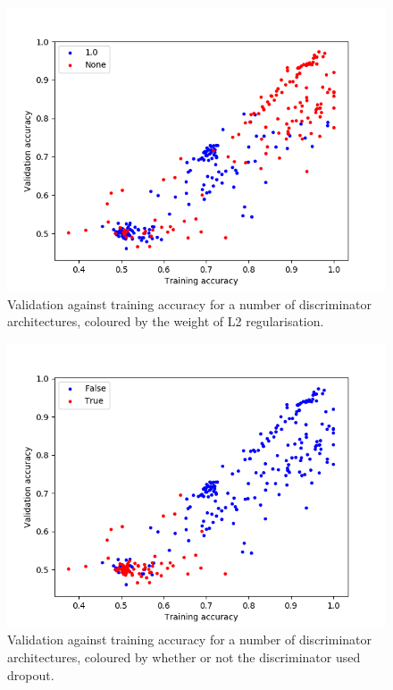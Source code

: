 \documentclass[a4paper]{article}
\begin{document}
\begin{figure}
  \centering
  \includegraphics[scale=0.75]{../../figures/circlesobjective/validation_vs_training_l2_weight.png}
  \caption{Validation against training accuracy for a number of discriminator architectures,
    coloured by the weight of L2 regularisation.}
  \label{fig:regularisationL2Weight}
  \end{figure}

\begin{figure}
  \centering
  \includegraphics[scale=0.75]{../../figures/circlesobjective/validation_vs_training_dropout.png}
  \caption{Validation against training accuracy for a number of discriminator architectures,
    coloured by whether or not the discriminator used dropout.}
  \label{fig:regularisationDropout}
  \end{figure}
\end{document}
